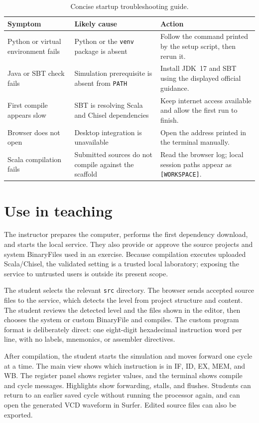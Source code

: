 \documentclass[11pt,a4paper]{article}
\begin{document}
\begin{table}[tb]
\centering
\caption{Concise startup troubleshooting guide.}
\label{tab:troubleshooting}
\small
\begin{tabularx}{\textwidth}{@{}p{}YY@{}}
\toprule
Symptom & Likely cause & Action \\
\midrule
Python or virtual environment fails & Python or the \texttt{venv} package is absent & Follow the command printed by the setup script, then rerun it. \\
Java or SBT check fails & Simulation prerequisite is absent from \texttt{PATH} & Install JDK~17 and SBT using the displayed official guidance. \\
First compile appears slow & SBT is resolving Scala and Chisel dependencies & Keep internet access available and allow the first run to finish. \\
Browser does not open & Desktop integration is unavailable & Open the address printed in the terminal manually. \\
Scala compilation fails & Submitted sources do not compile against the scaffold & Read the browser log; local session paths appear as \texttt{[WORKSPACE]}. \\
\bottomrule
\end{tabularx}
\end{table}

\section{Use in teaching}\label{sec:teaching}

The instructor prepares the computer, performs the first dependency download, and starts the local service. They also provide or approve the source projects and system BinaryFiles used in an exercise. Because compilation executes uploaded Scala/Chisel, the validated setting is a trusted local laboratory; exposing the service to untrusted users is outside its present scope.

The student selects the relevant \texttt{src} directory. The browser sends accepted source files to the service, which detects the level from project structure and content. The student reviews the detected level and the files shown in the editor, then chooses the system or custom BinaryFile and compiles. The custom program format is deliberately direct: one eight-digit hexadecimal instruction word per line, with no labels, mnemonics, or assembler directives.

After compilation, the student starts the simulation and moves forward one cycle at a time. The main view shows which instruction is in IF, ID, EX, MEM, and WB. The register panel shows register values, and the terminal shows compile and cycle messages. Highlights show forwarding, stalls, and flushes. Students can return to an earlier saved cycle without running the processor again, and can open the generated VCD waveform in Surfer. Edited source files can also be exported.
\end{document}
